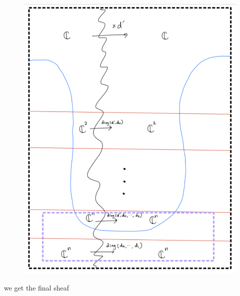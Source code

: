 \begin{enumerate}[label = (\roman*)]
\begin{enumerate}[label = (Step \arabic*)]
\begin{figure}[H]
    \centering
    \includegraphics[scale = 0.95]{diagrams/cobord5/6.png}
    \caption{}
    \label{fig:your-label}
\end{figure}

we get the final sheaf


\end{enumerate}
\end{enumerate}
